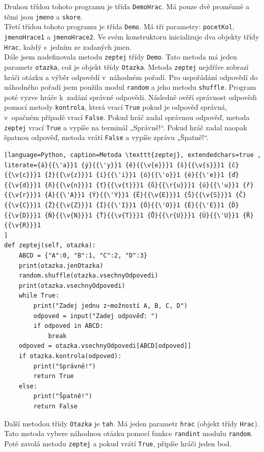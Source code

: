 \documentclass[12pt]{report}
\begin{document}
Druhou třídou tohoto programu je třída \texttt{DemoHrac}. Má pouze dvě proměnné a těmi jsou \texttt{jmeno} a \texttt{skore}.\\

Třetí třídou tohoto programu je třída \texttt{Demo}. Má tři parametry: \texttt{pocetKol}, \texttt{jmenoHrace1} a \texttt{jmenoHrace2}. Ve svém konstruktoru inicializuje dva objekty třídy \texttt{Hrac}, každý s~jedním ze zadaných jmen. \\

Dále jsem nadefinovala metodu \texttt{zeptej} třídy \texttt{Demo}. Tato metoda má jeden parametr \texttt{otazka}, což je objekt třídy \texttt{Otazka}. Metoda \texttt{zeptej} nejdříve zobrazí hráči otázku a výběr odpovědí v~náhodném pořadí. Pro uspořádání odpovědí do náhodného pořadí jsem použila modul \texttt{random} a jeho metodu \texttt{shuffle}. Program poté vyzve hráče k~zadání správné odpovědi. Následně ověří správnost odpovědi pomocí metody \texttt{kontrola}, která vrací \texttt{True} pokud je odpověď správná, v~opačném případě vrací \texttt{False}. Pokud hráč zadal správnou odpověď, metoda \texttt{zeptej} vrací \texttt{True} a vypíše na terminál „Správně!“. Pokud hráč zadal naopak špatnou odpověď, metoda vrátí \texttt{False} a vypíše zprávu „Špatně!“.

\begin{lstlisting}[language=Python, caption=Metoda \texttt{zeptej}, extendedchars=true , literate={á}{{\'a}}1 {ý}{{\'y}}1 {ě}{{\v{e}}}1 {š}{{\v{s}}}1 {č}{{\v{c}}}1 {ž}{{\v{z}}}1 {í}{{\'i}}1 {ó}{{\'o}}1 {é}{{\'e}}1 {ď}{{\v{d}}}1 {ň}{{\v{n}}}1 {ť}{{\v{t}}}1 {ů}{{\r{u}}}1 {ú}{{\'u}}1 {ř}{{\v{r}}}1 {Á}{{\'A}}1 {Ý}{{\'Y}}1 {Ě}{{\v{E}}}1 {Š}{{\v{S}}}1 {Č}{{\v{C}}}1 {Ž}{{\v{Z}}}1 {Í}{{\'I}}1 {Ó}{{\'O}}1 {É}{{\'E}}1 {Ď}{{\v{D}}}1 {Ň}{{\v{N}}}1 {Ť}{{\v{T}}}1 {Ů}{{\r{U}}}1 {Ú}{{\'U}}1 {Ř}{{\v{R}}}1
]
def zeptej(self, otazka):
    ABCD = {"A":0, "B":1, "C":2, "D":3}
    print(otazka.jenOtazka)
    random.shuffle(otazka.vsechnyOdpovedi)
    print(otazka.vsechnyOdpovedi)
    while True:
        print("Zadej jednu z~možností A, B, C, D")
        odpoved = input("Zadej odpověď: ")
        if odpoved in ABCD:
            break
    odpoved = otazka.vsechnyOdpovedi[ABCD[odpoved]]
    if otazka.kontrola(odpoved):
        print("Správně!")
        return True
    else:
        print("Špatně!")
        return False
\end{lstlisting}

Další metodou třídy \texttt{Otazka} je \texttt{tah}. Má jeden parametr \texttt{hrac} (objekt třídy \texttt{Hrac}). Tato metoda vybere náhodnou otázku pomocí funkce \texttt{randint} modulu \texttt{random}. Poté zavolá metodu \texttt{zeptej} a pokud vrátí \texttt{True}, připíše hráči jeden bod.
\end{document}
